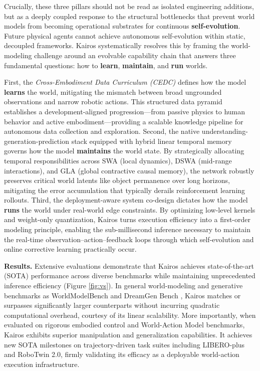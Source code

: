\begin{itemize}
    
\end{itemize}















Crucially, these three pillars should not be read as isolated engineering additions, but as a deeply coupled response to the structural bottlenecks that prevent world models from becoming operational substrates for continuous \textbf{self-evolution}. Future physical agents cannot achieve autonomous self-evolution within static, decoupled frameworks. Kairos systematically resolves this by framing the world-modeling challenge around an evolvable capability chain that answers three fundamental questions: how to \textbf{learn}, \textbf{maintain}, and \textbf{run} worlds. 

First, the \textit{Cross-Embodiment Data Curriculum (CEDC)} defines how the model \textbf{learns} the world, mitigating the mismatch between broad ungrounded observations and narrow robotic actions. This structured data pyramid establishes a development-aligned progression—from passive physics to human behavior and active embodiment—providing a scalable knowledge pipeline for autonomous data collection and exploration. Second, the native understanding-generation-prediction stack equipped with hybrid linear temporal memory governs how the model \textbf{maintains} the world state. By strategically allocating temporal responsibilities across SWA (local dynamics), DSWA (mid-range interactions), and GLA (global contractive causal memory), the network robustly preserves critical world latents like object permanence over long horizons, mitigating the error accumulation that typically derails reinforcement learning rollouts. Third, the deployment-aware system co-design dictates how the model \textbf{runs} the world under real-world edge constraints. By optimizing low-level kernels and weight-only quantization, Kairos turns execution efficiency into a first-order modeling principle, enabling the sub-millisecond inference necessary to maintain the real-time observation–action–feedback loops through which self-evolution and online corrective learning practically occur.

\textbf{Results.} Extensive evaluations demonstrate that Kairos achieves state-of-the-art (SOTA) performance across diverse benchmarks while maintaining unprecedented inference efficiency (Figure \ref{fig:vs}). In general world-modeling and generative benchmarks as WorldModelBench \cite{li2025worldmodelbench} and DreamGen Bench \cite{fan2025dreamgen}, Kairos matches or surpasses significantly larger counterparts without incurring quadratic computational overhead, courtesy of its linear scalability. More importantly, when evaluated on rigorous embodied control and World-Action Model benchmarks, Kairos exhibits superior manipulation and generalization capabilities. It achieves new SOTA milestones on trajectory-driven task suites including LIBERO-plus and RoboTwin 2.0, firmly validating its efficacy as a deployable world-action execution infrastructure.

